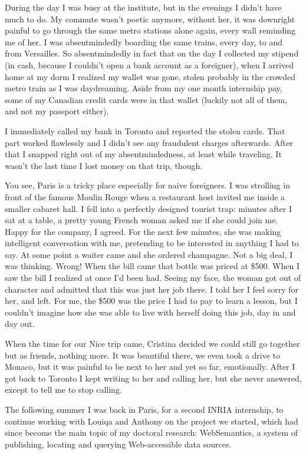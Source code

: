 \documentclass[12pt]{book}
\begin{document}
During the day I was busy at the institute, but in the evenings I didn't
have much to do. My commute wasn't poetic anymore, without her, it was
downright painful to go through the same metro stations alone again,
every wall reminding me of her. I was absentmindedly boarding the same
trains, every day, to and from Versailles. So absentmindedly in fact
that on the day I collected my stipend (in cash, because I couldn't open
a bank account as a foreigner), when I arrived home at my dorm I
realized my wallet was gone, stolen probably in the crowded metro train
as I was daydreaming. Aside from my one month internship pay, some of my
Canadian credit cards were in that wallet (luckily not all of them, and
not my passport either).

I immediately called my bank in Toronto and reported the stolen cards.
That part worked flawlessly and I didn't see any fraudulent charges
afterwards. After that I snapped right out of my absentmindedness, at
least while traveling. It wasn't the last time I lost money on that
trip, though.

You see, Paris is a tricky place especially for naive foreigners. I was
strolling in front of the famous Moulin Rouge when a restaurant host
invited me inside a smaller cabaret hall. I fell into a perfectly
designed tourist trap: minutes after I sat at a table, a pretty young
French woman asked me if she could join me. Happy for the company, I
agreed. For the next few minutes, she was making intelligent
conversation with me, pretending to be interested in anything I had to
say. At some point a waiter came and she ordered champagne. Not a big
deal, I was thinking. Wrong! When the bill came that bottle was priced
at \$500. When I saw the bill I realized at once I'd been had. Seeing my
face, the woman got out of character and admitted that this was just her
job there. I told her I feel sorry for her, and left. For me, the \$500
was the price I had to pay to learn a lesson, but I couldn't imagine how
she was able to live with herself doing this job, day in and day out.

When the time for our Nice trip came, Cristina decided we could still go
together but as friends, nothing more. It was beautiful there, we even
took a drive to Monaco, but it was painful to be next to her and yet so
far, emotionally. After I got back to Toronto I kept writing to her and
calling her, but she never answered, except to tell me to stop calling.

The following summer I was back in Paris, for a second INRIA internship,
to continue working with Louiqa and Anthony on the project we started,
which had since become the main topic of my doctoral research:
WebSemantics, a system of publishing, locating and querying
Web-accessible data sources.
\end{document}

